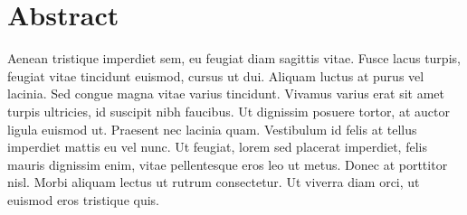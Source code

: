 \chapter*{Abstract}
Aenean tristique imperdiet sem, eu feugiat diam sagittis vitae. Fusce lacus turpis, feugiat vitae tincidunt euismod, cursus ut dui. Aliquam luctus at purus vel lacinia. Sed congue magna vitae varius tincidunt. Vivamus varius erat sit amet turpis ultricies, id suscipit nibh faucibus. Ut dignissim posuere tortor, at auctor ligula euismod ut. Praesent nec lacinia quam. Vestibulum id felis at tellus imperdiet mattis eu vel nunc. Ut feugiat, lorem sed placerat imperdiet, felis mauris dignissim enim, vitae pellentesque eros leo ut metus. Donec at porttitor nisl. Morbi aliquam lectus ut rutrum consectetur. Ut viverra diam orci, ut euismod eros tristique quis.
